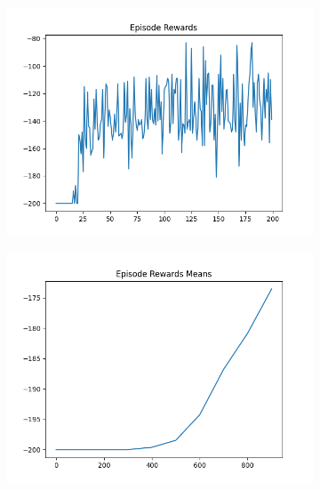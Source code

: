 \begin{figure}[H]
    \centering
    \begin{subfigure}{.47\linewidth}
        \centering
        \includegraphics[width=\textwidth]{mountain/2024-06-15_13-41-53_dqn_mountaincar_episode_rewards.png}
    \end{subfigure}
    \begin{subfigure}{.47\linewidth}
        \centering
        \includegraphics[width=\textwidth]{mountain/2024-06-15_10-54-10_dqn_mountaincar_episode_rewards_means.png}
    \end{subfigure}
    \begin{subfigure}{.47\linewidth}
        \centering

\end{subfigure}
\end{figure}
